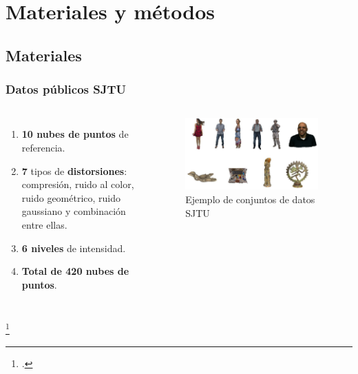 \section{Materiales y métodos}
\subsection{Materiales}
\begin{frame}
    \frametitle{Datos públicos SJTU}
    \begin{columns}
      \begin{enumerate}[<+->]
        \item \textbf{10 nubes de puntos} de referencia.  
        \item \textbf{7} tipos de \textbf{distorsiones}: compresión, ruido al color, 
          ruido geométrico, ruido gaussiano y combinación entre ellas.
        \item \textbf{6 niveles} de intensidad.
        \item \textbf{Total de 420 nubes de puntos}.
      \end{enumerate}
      \begin{figure}
        \includegraphics[width=0.95\textwidth]{imagenes/chapter3/SJTU}
        \caption{Ejemplo de conjuntos de datos SJTU\footnotemark}
        \label{fig:SJTU}
      \end{figure}
    \end{columns}
    \footcitetext{SJTU}
\end{frame}

